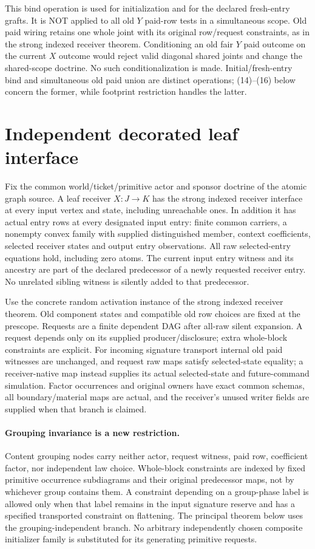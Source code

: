 \documentclass[11pt]{article}
\begin{document}
This bind operation is used for initialization and for the declared fresh-entry grafts. It is NOT applied to all old $Y$ paid-row tests in a simultaneous scope. Old paid wiring retains one whole joint with its original row/request constraints, as in the strong indexed receiver theorem. Conditioning an old fair $Y$ paid outcome on the current $X$ outcome would reject valid diagonal shared joints and change the shared-scope doctrine. No such conditionalization is made. Initial/fresh-entry bind and simultaneous old paid union are distinct operations; (14)--(16) below concern the former, while footprint restriction handles the latter.

\section{Independent decorated leaf interface}
Fix the common world/ticket/primitive actor and sponsor doctrine of the atomic graph source. A leaf receiver $X:J\to K$ has the strong indexed receiver interface at every input vertex and state, including unreachable ones. In addition it has actual entry rows at every designated input entry: finite common carriers, a nonempty convex family with supplied distinguished member, context coefficients, selected receiver states and output entry observations. All raw selected-entry equations hold, including zero atoms. The current input entry witness and its ancestry are part of the declared predecessor of a newly requested receiver entry. No unrelated sibling witness is silently added to that predecessor.

Use the concrete random activation instance of the strong indexed receiver theorem. Old component states and compatible old row choices are fixed at the prescope. Requests are a finite dependent DAG after all-raw silent expansion. A request depends only on its supplied producer/disclosure; extra whole-block constraints are explicit. For incoming signature transport internal old paid witnesses are unchanged, and request raw maps satisfy selected-state equality; a receiver-native map instead supplies its actual selected-state and future-command simulation. Factor occurrences and original owners have exact common schemas, all boundary/material maps are actual, and the receiver's unused writer fields are supplied when that branch is claimed.

\paragraph{Grouping invariance is a new restriction.} Content grouping nodes carry neither actor, request witness, paid row, coefficient factor, nor independent law choice. Whole-block constraints are indexed by fixed primitive occurrence subdiagrams and their original predecessor maps, not by whichever group contains them. A constraint depending on a group-phase label is allowed only when that label remains in the input signature reserve and has a specified transported constraint on flattening. The principal theorem below uses the grouping-independent branch. No arbitrary independently chosen composite initializer family is substituted for its generating primitive requests.
\end{document}
